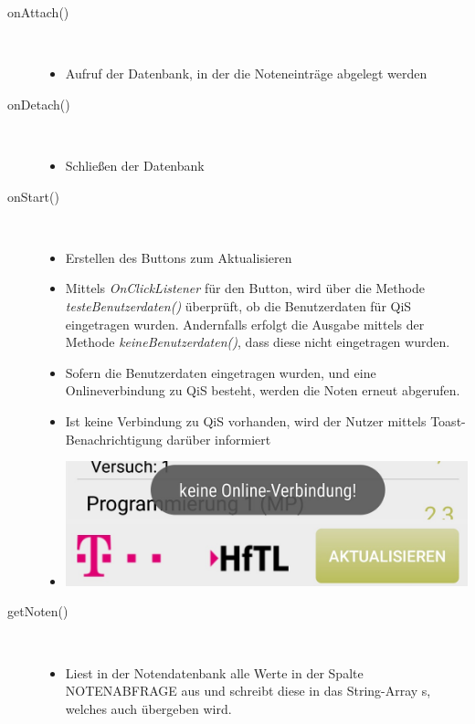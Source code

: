 \begin{description}
\item[onAttach()]~\par
\begin{itemize}
\item Aufruf der Datenbank, in der die Noteneinträge abgelegt werden
\end{itemize}

 
\item[onDetach()]~\par
\begin{itemize}
\item Schließen der Datenbank
\end{itemize}

 
\item[onStart()]~\par
\begin{itemize}
\item Erstellen des Buttons zum Aktualisieren
\item Mittels \textit{OnClickListener} für den Button, wird über die Methode \textit{testeBenutzerdaten()} überprüft, ob die Benutzerdaten für QiS eingetragen wurden. Andernfalls erfolgt die Ausgabe mittels der Methode \textit{keineBenutzerdaten()}, dass diese nicht eingetragen wurden. 
\item Sofern die Benutzerdaten eingetragen wurden, und eine Onlineverbindung zu QiS besteht, werden die Noten erneut abgerufen. 
\item Ist keine Verbindung zu QiS vorhanden, wird der Nutzer mittels Toast-Benachrichtigung darüber informiert
\item[] \includegraphics[scale=0.5]{05_Handbuch/img/Noten_Toast.jpg}
\end{itemize}
\item[getNoten()]~\par
\begin{itemize}
\item Liest in der Notendatenbank alle Werte in der Spalte \textcolor{lila}{NOTENABFRAGE} aus und schreibt diese in das String-Array s, welches auch übergeben wird.
\end{itemize}


\end{description}
